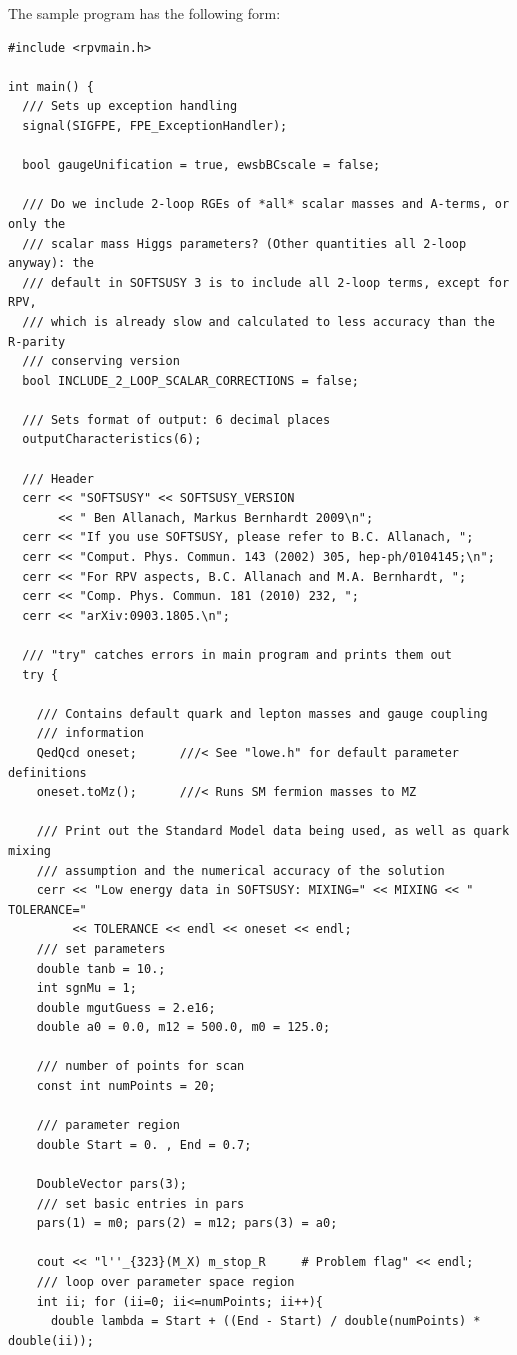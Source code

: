 \documentclass[final,3p,times,pdflatex]{elsarticle}
\begin{document}
The sample program has the following form: 
\small
\begin{verbatim}
#include <rpvmain.h>

int main() {
  /// Sets up exception handling
  signal(SIGFPE, FPE_ExceptionHandler); 

  bool gaugeUnification = true, ewsbBCscale = false;

  /// Do we include 2-loop RGEs of *all* scalar masses and A-terms, or only the
  /// scalar mass Higgs parameters? (Other quantities all 2-loop anyway): the
  /// default in SOFTSUSY 3 is to include all 2-loop terms, except for RPV,
  /// which is already slow and calculated to less accuracy than the R-parity
  /// conserving version
  bool INCLUDE_2_LOOP_SCALAR_CORRECTIONS = false;

  /// Sets format of output: 6 decimal places
  outputCharacteristics(6);

  /// Header  
  cerr << "SOFTSUSY" << SOFTSUSY_VERSION 
       << " Ben Allanach, Markus Bernhardt 2009\n";
  cerr << "If you use SOFTSUSY, please refer to B.C. Allanach, ";
  cerr << "Comput. Phys. Commun. 143 (2002) 305, hep-ph/0104145;\n";
  cerr << "For RPV aspects, B.C. Allanach and M.A. Bernhardt, ";
  cerr << "Comp. Phys. Commun. 181 (2010) 232, ";
  cerr << "arXiv:0903.1805.\n";

  /// "try" catches errors in main program and prints them out
  try {

    /// Contains default quark and lepton masses and gauge coupling
    /// information 
    QedQcd oneset;      ///< See "lowe.h" for default parameter definitions 
    oneset.toMz();      ///< Runs SM fermion masses to MZ
    
    /// Print out the Standard Model data being used, as well as quark mixing
    /// assumption and the numerical accuracy of the solution
    cerr << "Low energy data in SOFTSUSY: MIXING=" << MIXING << " TOLERANCE=" 
         << TOLERANCE << endl << oneset << endl;
    /// set parameters
    double tanb = 10.;
    int sgnMu = 1;
    double mgutGuess = 2.e16; 
    double a0 = 0.0, m12 = 500.0, m0 = 125.0; 
    
    /// number of points for scan
    const int numPoints = 20; 
    
    /// parameter region
    double Start = 0. , End = 0.7;
    
    DoubleVector pars(3);
    /// set basic entries in pars
    pars(1) = m0; pars(2) = m12; pars(3) = a0;
      
    cout << "l''_{323}(M_X) m_stop_R     # Problem flag" << endl;
    /// loop over parameter space region
    int ii; for (ii=0; ii<=numPoints; ii++){
      double lambda = Start + ((End - Start) / double(numPoints) * double(ii));
      

\end{verbatim}
\end{document}
